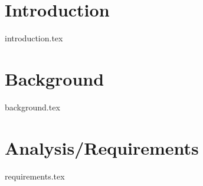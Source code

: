 \documentclass{l4proj}
\begin{document}
%
%
%
%
%
%
%
%
\chapter{Introduction}

{introduction.tex}

\chapter{Background}\label{bg}
{background.tex}

\chapter{Analysis/Requirements}\label{anReq}
{requirements.tex}
\end{document}
